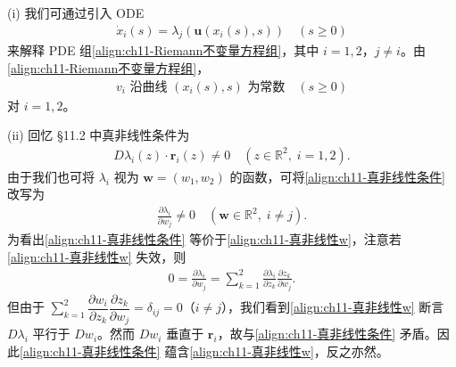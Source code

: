 \documentclass[../../main.tex]{subfiles}
\begin{document}
\begin{remark}
(i) 我们可通过引入 ODE
\begin{align}
\dot{x}_i(s)=\lambda_j(\mathbf{u}(x_i(s),s)) \quad (s\geqslant 0)
\label{align:ch11-特征ODE}
\end{align}
来解释 PDE 组\eqref{align:ch11-Riemann不变量方程组}，其中 $i=1,2$，$j\neq i$。由\eqref{align:ch11-Riemann不变量方程组}，
\begin{align}
v_i \text{ 沿曲线 } (x_i(s),s) \text{ 为常数} \quad (s\geqslant 0)
\label{align:ch11-v常数}
\end{align}
对 $i=1,2$。

(ii) 回忆 \S11.2 中真非线性条件为
\begin{align}
D\lambda_i(z)\cdot\mathbf{r}_i(z)\neq 0 \quad (z\in\mathbb{R}^2,\;i=1,2).
\label{align:ch11-真非线性条件}
\end{align}
由于我们也可将 $\lambda_i$ 视为 $\mathbf{w}=(w_1,w_2)$ 的函数，可将\eqref{align:ch11-真非线性条件} 改写为
\begin{align}
\frac{\partial\lambda_i}{\partial w_j}\neq 0 \quad (\mathbf{w}\in\mathbb{R}^2,\;i\neq j).
\label{align:ch11-真非线性w}
\end{align}
为看出\eqref{align:ch11-真非线性条件} 等价于\eqref{align:ch11-真非线性w}，注意若\eqref{align:ch11-真非线性w} 失效，则
\begin{align*}
0=\frac{\partial\lambda_i}{\partial w_j}=\sum_{k=1}^2\frac{\partial\lambda_i}{\partial z_k}\frac{\partial z_k}{\partial w_j}.
\end{align*}
但由于 $\sum_{k=1}^2\dfrac{\partial w_i}{\partial z_k}\dfrac{\partial z_k}{\partial w_j}=\delta_{ij}=0$（$i\neq j$），我们看到\eqref{align:ch11-真非线性w} 断言 $D\lambda_i$ 平行于 $Dw_i$。然而 $Dw_i$ 垂直于 $\mathbf{r}_i$，故与\eqref{align:ch11-真非线性条件} 矛盾。因此\eqref{align:ch11-真非线性条件} 蕴含\eqref{align:ch11-真非线性w}，反之亦然。
\end{remark}
\end{document}
